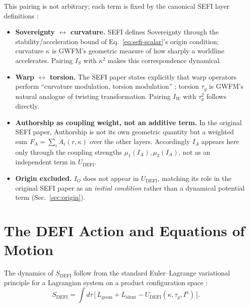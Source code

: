 \documentclass[aip,jmp,reprint,onecolumn,nofootinbib]{revtex4-2}
\begin{document}
This pairing is not arbitrary; each term is fixed by the canonical SEFI layer
definitions \cite{DuttonSEFI2026}:
\begin{itemize}
\item \textbf{Sovereignty $\leftrightarrow$ curvature.} SEFI defines Sovereignty
through the stability/acceleration bound of Eq.~\eqref{eq:sefi-scalar}'s origin
condition; curvature $\kappa$ is GWFM's geometric measure of how sharply a
worldline accelerates. Pairing $I_S$ with $\kappa^2$ makes this correspondence
dynamical.
\item \textbf{Warp $\leftrightarrow$ torsion.} The SEFI paper states explicitly
that warp operators perform ``curvature modulation, torsion modulation''
\cite{DuttonSEFI2026}; torsion $\tau_g$ is GWFM's natural analogue of twisting
transformation. Pairing $I_W$ with $\tau_g^2$ follows directly.
\item \textbf{Authorship as coupling weight, not an additive term.} In the
original SEFI paper, Authorship is not its own geometric quantity but a weighted
sum $F_A=\sum_i A_i(r,\kappa)$ over the other layers. Accordingly $I_A$ appears
here only through the coupling strengths $\mu_1(I_A),\mu_2(I_A)$, not as an
independent term in $U_{\text{DEFI}}$.
\item \textbf{Origin excluded.} $I_O$ does not appear in $U_{\text{DEFI}}$,
matching its role in the original SEFI paper as an \emph{initial condition}
rather than a dynamical potential term (Sec.~\ref{sec:origin}).
\end{itemize}

\section{The DEFI Action and Equations of Motion}

The dynamics of $S_{\text{DEFI}}$ follow from the standard Euler--Lagrange
variational principle for a Lagrangian system on a product configuration space
\cite{GoldsteinPooleSafko2002,MarsdenRatiu1999}:
\begin{equation}
S_{\text{DEFI}} = \int d\tau\, \Big[\, L_{\text{geom}} + L_{\text{ident}}
- U_{\text{DEFI}}(\kappa,\tau_g,I^a) \,\Big].
\label{eq:action}
\end{equation}
\end{document}
